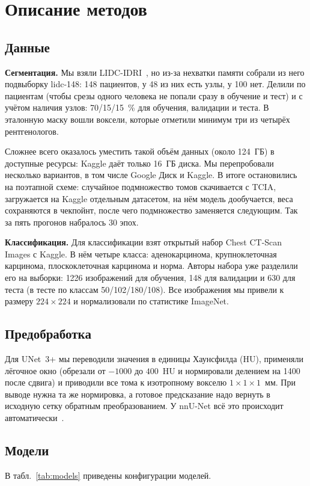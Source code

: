\documentclass{misisarticle}
\begin{document}
\section{Описание методов}\label{sec:methods}
\subsection{Данные}\label{sec:data}
\textbf{Сегментация.} Мы взяли LIDC-IDRI~\cite{lidc}, но из-за нехватки памяти собрали из него подвыборку lidc-148: 148 пациентов, у 48 из них есть узлы, у 100 нет. Делили по пациентам (чтобы срезы одного человека не попали сразу в обучение и тест) и с учётом наличия узлов: 70/15/15~\% для обучения, валидации и теста. В эталонную маску вошли воксели, которые отметили минимум три из четырёх рентгенологов.

Сложнее всего оказалось уместить такой объём данных (около 124~ГБ) в доступные ресурсы: Kaggle даёт только 16~ГБ диска. Мы перепробовали несколько вариантов, в том числе Google Диск и Kaggle. В итоге остановились на поэтапной схеме: случайное подмножество томов скачивается с TCIA, загружается на Kaggle отдельным датасетом, на нём модель дообучается, веса сохраняются в чекпойнт, после чего подмножество заменяется следующим. Так за пять прогонов набралось 30 эпох.

\textbf{Классификация.} Для классификации взят открытый набор Chest CT-Scan Images с Kaggle. В нём четыре класса: аденокарцинома, крупноклеточная карцинома, плоскоклеточная карцинома и норма. Авторы набора уже разделили его на выборки: 1226 изображений для обучения, 148 для валидации и 630 для теста (в тесте по классам 50/102/180/108). Все изображения мы привели к размеру $224\times224$ и нормализовали по статистике ImageNet.

\subsection{Предобработка}
Для UNet~3+ мы переводили значения в единицы Хаунсфилда (HU), применяли лёгочное окно (обрезали от $-1000$ до $400$~HU и нормировали делением на 1400 после сдвига) и приводили все тома к изотропному вокселю $1\times1\times1$~мм. При выводе нужна та же нормировка, а готовое предсказание надо вернуть в исходную сетку обратным преобразованием. У nnU-Net всё это происходит автоматически~\cite{isensee}.

\subsection{Модели}
В табл.~\ref{tab:models} приведены конфигурации моделей.
\end{document}
